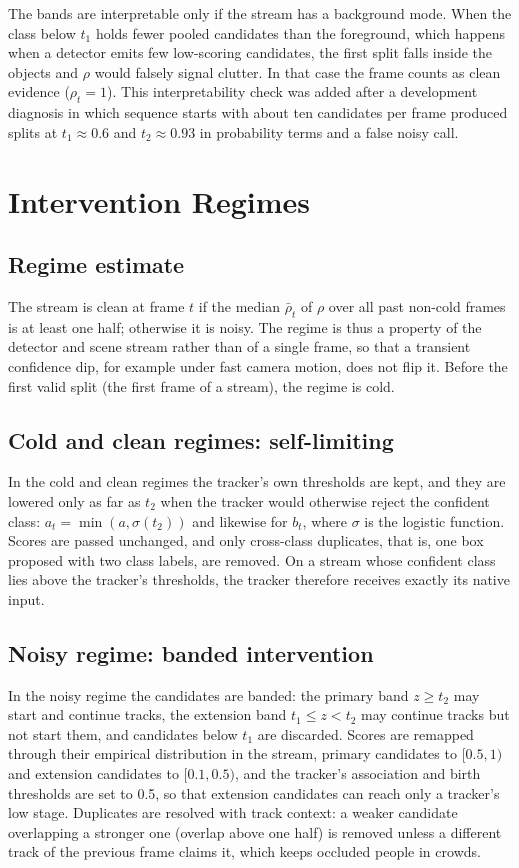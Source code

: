 The bands are interpretable only if the stream has a background mode. When the class below $t_1$ holds fewer pooled candidates than the foreground, which happens when a detector emits few low-scoring candidates, the first split falls inside the objects and $\rho$ would falsely signal clutter. In that case the frame counts as clean evidence ($\rho_t=1$). This interpretability check was added after a development diagnosis in which sequence starts with about ten candidates per frame produced splits at $t_1\approx0.6$ and $t_2\approx0.93$ in probability terms and a false noisy call.

\section{Intervention Regimes}\label{sec:ch5-regimes}

\subsection{Regime estimate}
The stream is clean at frame $t$ if the median $\bar\rho_t$ of $\rho$ over all past non-cold frames is at least one half; otherwise it is noisy. The regime is thus a property of the detector and scene stream rather than of a single frame, so that a transient confidence dip, for example under fast camera motion, does not flip it. Before the first valid split (the first frame of a stream), the regime is cold.

\subsection{Cold and clean regimes: self-limiting}
In the cold and clean regimes the tracker's own thresholds are kept, and they are lowered only as far as $t_2$ when the tracker would otherwise reject the confident class: $a_t=\min(a, \sigma(t_2))$ and likewise for $b_t$, where $\sigma$ is the logistic function. Scores are passed unchanged, and only cross-class duplicates, that is, one box proposed with two class labels, are removed. On a stream whose confident class lies above the tracker's thresholds, the tracker therefore receives exactly its native input.

\subsection{Noisy regime: banded intervention}
In the noisy regime the candidates are banded: the primary band $z\ge t_2$ may start and continue tracks, the extension band $t_1\le z<t_2$ may continue tracks but not start them, and candidates below $t_1$ are discarded. Scores are remapped through their empirical distribution in the stream, primary candidates to $[0.5,1)$ and extension candidates to $[0.1,0.5)$, and the tracker's association and birth thresholds are set to 0.5, so that extension candidates can reach only a tracker's low stage. Duplicates are resolved with track context: a weaker candidate overlapping a stronger one (overlap above one half) is removed unless a different track of the previous frame claims it, which keeps occluded people in crowds.

